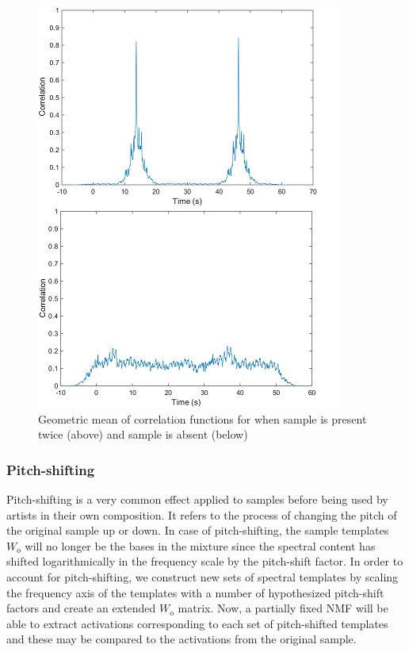 \documentclass{article}
\begin{document}
\begin{figure}[!ht]
\centering
\includegraphics[width=\linewidth]{corr.png}
\caption{Geometric mean of correlation functions for when sample is present twice (above) and sample is absent (below)}
\label{fig1}
\end{figure}

\subsubsection{Pitch-shifting}

Pitch-shifting is a very common effect applied to samples before being used by artists in their own composition. It refers to the process of changing the pitch of the original sample up or down. In case of pitch-shifting, the sample templates $W_\mathrm{o}$ will no longer be the bases in the mixture since the spectral content has shifted logarithmically in the frequency scale by the pitch-shift factor. In order to account for pitch-shifting, we construct new sets of spectral templates by scaling the frequency axis of the templates with a number of hypothesized pitch-shift factors and create an extended $W_\mathrm{o}$ matrix. Now, a partially fixed NMF will be able to extract activations corresponding to each set of pitch-shifted templates and these may be compared to the activations from the original sample.
\end{document}
